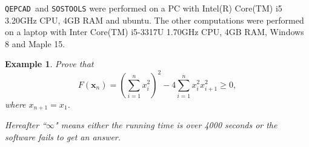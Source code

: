 \documentclass[amsthm]{elsart}
\def \Proineq {{\tt DPS}}
\def \RAGlib {{\tt RAGlib}}
\def \FI {{\tt FI}}
\def \QEPCAD {{\tt QEPCAD}}
\def \PCAD {{\tt PCAD}}
\def \TwoPro {{\tt PSD-HpTwo}}
\def \FI {{\tt FI}}
\def \QEPCAD {{\tt QEPCAD}}
\def \PCAD {{\tt PCAD}}
\newtheorem{ex}{Example}   \renewcommand{\algorithmicrequire}{\textsf{Input:}}
\begin{document}
\QEPCAD\ and {\tt SOSTOOLS} were performed on a PC with Intel(R) Core(TM) i5 3.20GHz CPU, 4GB RAM and ubuntu.
The other computations were performed on a laptop with Inter Core(TM) i5-3317U 1.70GHz CPU, 4GB RAM, Windows 8 and Maple 15.
\begin{comment}
\begin{ex}
  Random example.
\end{ex}
\end{comment}
\begin{ex}\label{ex:62} \citep{han2011} Prove that
        $$F(\bm{x}_{n})=(\sum_{i=1}^nx_i^2)^2-4\sum_{i=1}^n x_i^2x_{i+1}^2\ge 0,$$
        where $x_{n+1}=x_1$.

Hereafter ``$\infty$" means either the running time is over 4000 seconds or the software fails to get an answer.
\begin{comment}
        \begin{center}
                \begin{tabular}{llllllll}
                        \hline$n$ & \TwoPro & \RAGlib&   \Proineq &  \FI& \PCAD&\QEPCAD\\
                        \hline
                        $5$        &0.28&6.98&0.29&0.10&0.26&0.10 \\
                        $8$        &0.95&177.75& $\infty$&$\infty$&$\infty$&$\infty$\\
                        $11$       &6.26&3990.01&$\infty$&$\infty$&$\infty$&$\infty$\\
            $17$       &29.53 &$\infty$ &$\infty$&$\infty$&$\infty$&$\infty$\\
            $23$       &140.01&$\infty$ &$\infty$&$\infty$&$\infty$&$\infty$\\
            $30$       &1488.64&$\infty$ &$\infty$&$\infty$&$\infty$&$\infty$\\
                        \hline
                \end{tabular}
        \end{center}
\end{comment}


\end{ex}
\end{document}
